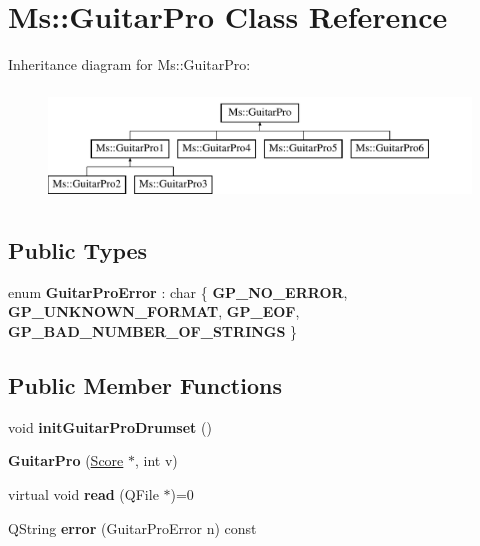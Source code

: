 \hypertarget{class_ms_1_1_guitar_pro}{}\section{Ms\+:\+:Guitar\+Pro Class Reference}
\label{class_ms_1_1_guitar_pro}
Inheritance diagram for Ms\+:\+:Guitar\+Pro\+:\begin{figure}[H]
\begin{center}
\leavevmode
\includegraphics[height=3.000000cm]{class_ms_1_1_guitar_pro}
\end{center}
\end{figure}
\subsection*{Public Types}
\begin{DoxyCompactItemize}
\item 
\mbox{\label{class_ms_1_1_guitar_pro_a22c176114b2efbc1e7076761d4b598be}} 
enum {\bfseries Guitar\+Pro\+Error} \+: char \{ {\bfseries G\+P\+\_\+\+N\+O\+\_\+\+E\+R\+R\+OR}, 
{\bfseries G\+P\+\_\+\+U\+N\+K\+N\+O\+W\+N\+\_\+\+F\+O\+R\+M\+AT}, 
{\bfseries G\+P\+\_\+\+E\+OF}, 
{\bfseries G\+P\+\_\+\+B\+A\+D\+\_\+\+N\+U\+M\+B\+E\+R\+\_\+\+O\+F\+\_\+\+S\+T\+R\+I\+N\+GS}
 \}
\end{DoxyCompactItemize}
\subsection*{Public Member Functions}
\begin{DoxyCompactItemize}
\item 
\mbox{\label{class_ms_1_1_guitar_pro_a34e23c0d35f564e06b85f764ce5a0908}} 
void {\bfseries init\+Guitar\+Pro\+Drumset} ()
\item 
\mbox{\label{class_ms_1_1_guitar_pro_a39f3df06c05c56d1b0c3e7d7bc16c3c2}} 
{\bfseries Guitar\+Pro} (\hyperlink{class_ms_1_1_score}{Score} $\ast$, int v)
\item 
\mbox{\label{class_ms_1_1_guitar_pro_a1bc690c08460cfde3d08faf48155ec92}} 
virtual void {\bfseries read} (Q\+File $\ast$)=0
\item 
\mbox{\label{class_ms_1_1_guitar_pro_aaa7b5d5176a9abe97592dedf9ee7b148}} 
Q\+String {\bfseries error} (Guitar\+Pro\+Error n) const
\end{DoxyCompactItemize}
